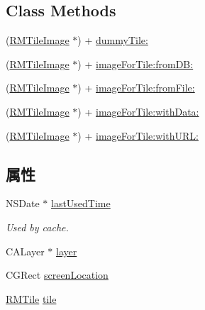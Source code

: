 \subsection*{Class Methods}
\begin{DoxyCompactItemize}
\item 
(\hyperlink{interface_r_m_tile_image}{R\-M\-Tile\-Image} $\ast$) + \hyperlink{interface_r_m_tile_image_a7ab42fc7d8b3df9a387c98068a3858a4}{dummy\-Tile\-:}
\item 
(\hyperlink{interface_r_m_tile_image}{R\-M\-Tile\-Image} $\ast$) + \hyperlink{interface_r_m_tile_image_a7e7709f8ac83ec188bc7868ad74e6d32}{image\-For\-Tile\-:from\-D\-B\-:}
\item 
(\hyperlink{interface_r_m_tile_image}{R\-M\-Tile\-Image} $\ast$) + \hyperlink{interface_r_m_tile_image_ac7142e3ee75110f2a39f24b3eced7ff9}{image\-For\-Tile\-:from\-File\-:}
\item 
(\hyperlink{interface_r_m_tile_image}{R\-M\-Tile\-Image} $\ast$) + \hyperlink{interface_r_m_tile_image_ad916af32519f985d1886ea38f0686307}{image\-For\-Tile\-:with\-Data\-:}
\item 
(\hyperlink{interface_r_m_tile_image}{R\-M\-Tile\-Image} $\ast$) + \hyperlink{interface_r_m_tile_image_a8d4ab34455179fc7fb7ab6433f61dbd1}{image\-For\-Tile\-:with\-U\-R\-L\-:}
\end{DoxyCompactItemize}
\subsection*{属性}
\begin{DoxyCompactItemize}
\item 
N\-S\-Date $\ast$ \hyperlink{interface_r_m_tile_image_a31ac5bae990405b6e665cfd3dd9e54c8}{last\-Used\-Time}
\begin{DoxyCompactList}\small\item\em Used by cache. \end{DoxyCompactList}\item 
C\-A\-Layer $\ast$ \hyperlink{interface_r_m_tile_image_aa83652d7c55218b6fae37c70280cca18}{layer}
\item 
C\-G\-Rect \hyperlink{interface_r_m_tile_image_aedf8f108ad32b37c9eb7df5895134695}{screen\-Location}
\item 
\hyperlink{struct_r_m_tile}{R\-M\-Tile} \hyperlink{interface_r_m_tile_image_a084a28ae27d9153ec2acd5505c614505}{tile}
\end{DoxyCompactItemize}


